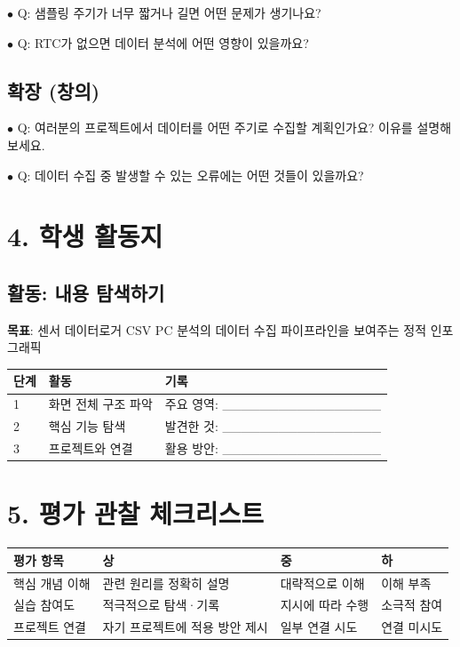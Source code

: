 \documentclass[11pt,a4paper]{article}
\begin{document}
$\bullet$ Q: 샘플링 주기가 너무 짧거나 길면 어떤 문제가 생기나요?

$\bullet$ Q: RTC가 없으면 데이터 분석에 어떤 영향이 있을까요?


\subsection*{확장 (창의)}

$\bullet$ Q: 여러분의 프로젝트에서 데이터를 어떤 주기로 수집할 계획인가요? 이유를 설명해보세요.

$\bullet$ Q: 데이터 수집 중 발생할 수 있는 오류에는 어떤 것들이 있을까요?



\section*{4. 학생 활동지}

\subsection*{활동: 내용 탐색하기}

\textbf{목표}: 센서 \textrightarrow{} 데이터로거 \textrightarrow{} CSV \textrightarrow{} PC 분석의 데이터 수집 파이프라인을 보여주는 정적 인포그래픽


\begin{center}
\renewcommand{\arraystretch}{1.4}
\begin{tabular}{|p{1.5cm}|p{5.6cm}|p{7.9cm}|}
\hline
\rowcolor{tableheader}
\textbf{단계} & \textbf{활동} & \textbf{기록} \\
\hline
1 & 화면 전체 구조 파악 & 주요 영역: \_\_\_\_\_\_\_\_\_\_\_\_\_\_\_\_\_ \\
\hline
2 & 핵심 기능 탐색 & 발견한 것: \_\_\_\_\_\_\_\_\_\_\_\_\_\_\_\_\_ \\
\hline
3 & 프로젝트와 연결 & 활용 방안: \_\_\_\_\_\_\_\_\_\_\_\_\_\_\_\_\_ \\
\hline
\end{tabular}
\end{center}


\section*{5. 평가 관찰 체크리스트}

\begin{center}
\renewcommand{\arraystretch}{1.4}
\begin{tabular}{|p{3.0cm}|p{6.3cm}|p{3.4cm}|p{2.3cm}|}
\hline
\rowcolor{tableheader}
\textbf{평가 항목} & \textbf{상} & \textbf{중} & \textbf{하} \\
\hline
핵심 개념 이해 & 관련 원리를 정확히 설명 & 대략적으로 이해 & 이해 부족 \\
\hline
실습 참여도 & 적극적으로 탐색·기록 & 지시에 따라 수행 & 소극적 참여 \\
\hline
프로젝트 연결 & 자기 프로젝트에 적용 방안 제시 & 일부 연결 시도 & 연결 미시도 \\
\hline
\end{tabular}
\end{center}
\end{document}

